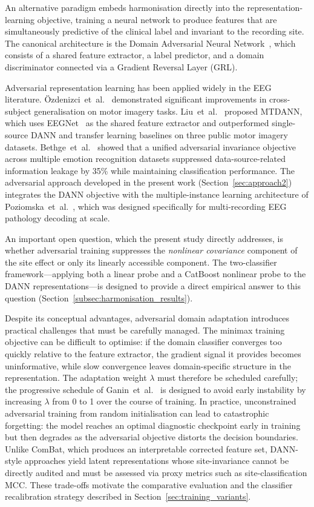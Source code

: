 \documentclass[preprint,12pt]{elsarticle}
\begin{document}
An alternative paradigm embeds harmonisation directly into the
representation-learning objective, training a neural network to
produce features that are simultaneously predictive of the clinical
label and invariant to the recording site.
The canonical architecture is the Domain Adversarial Neural
Network~\cite{ganin2016domain}, which consists of a shared feature
extractor, a label predictor, and a domain discriminator connected via
a Gradient Reversal Layer (GRL).

Adversarial representation learning has been applied widely in the
EEG literature.
\"{O}zdenizci~et~al.~\cite{ozdenizci2020invariant} demonstrated
significant improvements in cross-subject generalisation on motor
imagery tasks.
Liu~et~al.~\cite{liu2023multisource} proposed MTDANN, which uses
EEGNet~\cite{lawhern2018eegnet} as the shared feature extractor and
outperformed single-source DANN and transfer learning baselines on
three public motor imagery datasets.
Bethge~et~al.~\cite{bethge2022multidomain} showed that a unified
adversarial invariance objective across multiple emotion recognition
datasets suppressed data-source-related information leakage by 35\%
while maintaining classification performance.
The adversarial approach developed in the present work
(Section~\ref{sec:approach2}) integrates the DANN objective
with the multiple-instance learning architecture of
Poziomska~et~al.~\cite{poziomska2026quantity}, which was designed
specifically for multi-recording EEG pathology decoding at scale.

An important open question, which the present study directly
addresses, is whether adversarial training suppresses the
\emph{nonlinear covariance} component of the site effect or only its
linearly accessible component.
The two-classifier framework---applying both a linear probe and a
CatBoost nonlinear probe to the DANN representations---is designed to
provide a direct empirical answer to this question
(Section~\ref{subsec:harmonisation_results}).

Despite its conceptual advantages, adversarial domain adaptation
introduces practical challenges that must be carefully managed.
The minimax training objective can be difficult to optimise: if the
domain classifier converges too quickly relative to the feature
extractor, the gradient signal it provides becomes uninformative,
while slow convergence leaves domain-specific structure in the
representation.
The adaptation weight $\lambda$ must therefore be scheduled carefully;
the progressive schedule of Ganin~et~al.~\cite{ganin2016domain} is
designed to avoid early instability by increasing $\lambda$ from 0 to
1 over the course of training.
In practice, unconstrained adversarial training from random
initialisation can lead to catastrophic forgetting: the model reaches
an optimal diagnostic checkpoint early in training but then degrades
as the adversarial objective distorts the decision boundaries.
Unlike ComBat, which produces an interpretable corrected feature set,
DANN-style approaches yield latent representations whose
site-invariance cannot be directly audited and must be assessed via
proxy metrics such as site-classification MCC.
These trade-offs motivate the comparative evaluation and the
classifier recalibration strategy described in
Section~\ref{sec:training_variants}.
\end{document}
